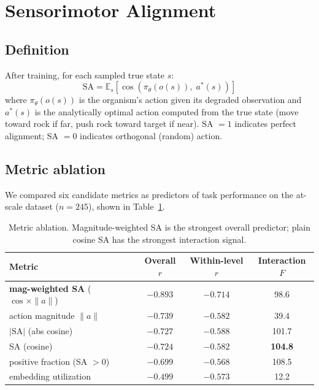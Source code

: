 \documentclass{article}
\begin{document}
\section{Sensorimotor Alignment}
\label{sec:sa}

\subsection{Definition}

After training, for each sampled true state $s$:
\begin{equation}
\text{SA} = \mathbb{E}_s\left[\cos\left(\pi_\theta(o(s)),\; a^*(s)\right)\right]
\label{eq:sa}
\end{equation}
where $\pi_\theta(o(s))$ is the organism's action given its degraded observation
and $a^*(s)$ is the analytically optimal action computed from the true state (move
toward rock if far, push rock toward target if near). SA $= 1$ indicates perfect
alignment; SA $= 0$ indicates orthogonal (random) action.

\subsection{Metric ablation}

We compared six candidate metrics as predictors of task performance on the
at-scale dataset ($n=245$), shown in Table~\ref{tab:ablation}.

\begin{table}[h]
\centering
\caption{Metric ablation. Magnitude-weighted SA is the strongest overall
predictor; plain cosine SA has the strongest interaction signal.}
\label{tab:ablation}
\begin{tabular}{lccc}
\toprule
Metric & Overall $r$ & Within-level $r$ & Interaction $F$ \\
\midrule
\textbf{mag-weighted SA} ($\cos \times \|a\|$) & \textbf{$-0.893$} & \textbf{$-0.714$} & 98.6 \\
action magnitude $\|a\|$ & $-0.739$ & $-0.582$ & 39.4 \\
$|\text{SA}|$ (abs cosine) & $-0.727$ & $-0.588$ & 101.7 \\
SA (cosine) & $-0.724$ & $-0.582$ & \textbf{104.8} \\
positive fraction (SA $> 0$) & $-0.699$ & $-0.568$ & 108.5 \\
embedding utilization & $-0.499$ & $-0.573$ & 12.2 \\
\bottomrule
\end{tabular}
\end{table}
\end{document}
